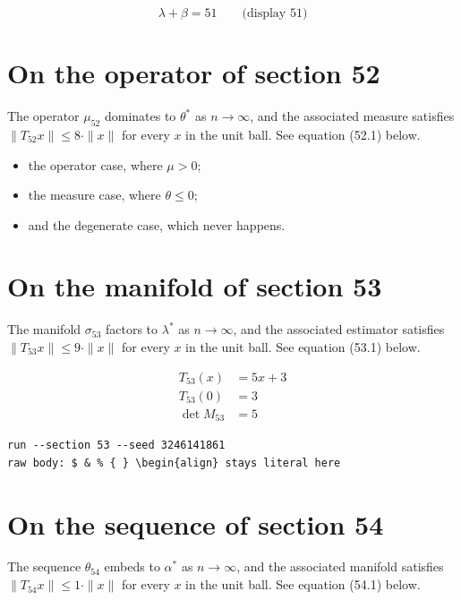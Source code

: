 \documentclass{article}
\begin{document}
$$
\lambda + \beta = 51 \qquad \text{(display 51)}
$$

\section{On the operator of section 52}
The operator $\mu_{52}$ dominates to $\theta^{*}$ as $n \to \infty$,
and the associated measure satisfies $\|T_{52} x\| \leq 8 \cdot \|x\|$
for every $x$ in the unit ball. See equation (52.1) below.

\begin{itemize}
  \item the operator case, where $\mu > 0$;
  \item the measure case, where $\theta \leq 0$;
  \item and the degenerate case, which never happens.
\end{itemize}

\section{On the manifold of section 53}
The manifold $\sigma_{53}$ factors to $\lambda^{*}$ as $n \to \infty$,
and the associated estimator satisfies $\|T_{53} x\| \leq 9 \cdot \|x\|$
for every $x$ in the unit ball. See equation (53.1) below.

\begin{align}
T_{53}(x) &= 5 x + 3 \\
T_{53}(0) &= 3 \\
\det M_{53} &= 5
\end{align}

\begin{verbatim}
run --section 53 --seed 3246141861
raw body: $ & % { } \begin{align} stays literal here
\end{verbatim}

\section{On the sequence of section 54}
The sequence $\theta_{54}$ embeds to $\alpha^{*}$ as $n \to \infty$,
and the associated manifold satisfies $\|T_{54} x\| \leq 1 \cdot \|x\|$
for every $x$ in the unit ball. See equation (54.1) below.
\end{document}
